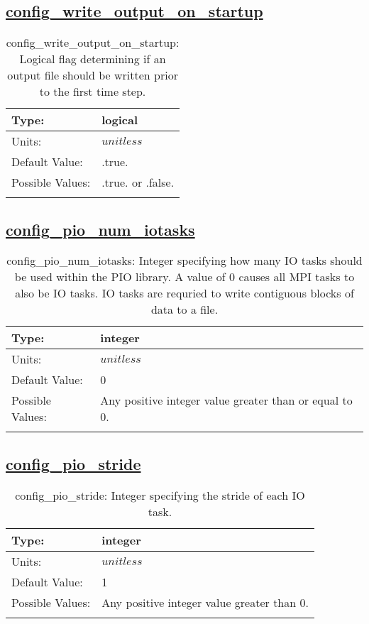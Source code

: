 \subsection[config\_write\_output\_on\_startup]{\hyperref[sec:nm_tab_io]{config\_write\_output\_on\_startup}}
\label{subsec:nm_sec_config_write_output_on_startup}
\begin{center}
\begin{longtable}{| p{2.0in} || p{4.0in} |}
    \hline
    Type: & logical \\
    \hline
    Units: & $unitless$ \\
    \hline
    Default Value: & .true. \\
    \hline
    Possible Values: & .true. or .false. \\
    \hline
    \caption{config\_write\_output\_on\_startup: Logical flag determining if an output file should be written prior to the first time step.}
\end{longtable}
\end{center}
\subsection[config\_pio\_num\_iotasks]{\hyperref[sec:nm_tab_io]{config\_pio\_num\_iotasks}}
\label{subsec:nm_sec_config_pio_num_iotasks}
\begin{center}
\begin{longtable}{| p{2.0in} || p{4.0in} |}
    \hline
    Type: & integer \\
    \hline
    Units: & $unitless$ \\
    \hline
    Default Value: & 0 \\
    \hline
    Possible Values: & Any positive integer value greater than or equal to 0. \\
    \hline
    \caption{config\_pio\_num\_iotasks: Integer specifying how many IO tasks should be used within the PIO library. A value of 0 causes all MPI tasks to also be IO tasks. IO tasks are requried to write contiguous blocks of data to a file.}
\end{longtable}
\end{center}
\subsection[config\_pio\_stride]{\hyperref[sec:nm_tab_io]{config\_pio\_stride}}
\label{subsec:nm_sec_config_pio_stride}
\begin{center}
\begin{longtable}{| p{2.0in} || p{4.0in} |}
    \hline
    Type: & integer \\
    \hline
    Units: & $unitless$ \\
    \hline
    Default Value: & 1 \\
    \hline
    Possible Values: & Any positive integer value greater than 0. \\
    \hline
    \caption{config\_pio\_stride: Integer specifying the stride of each IO task.}
\end{longtable}
\end{center}
